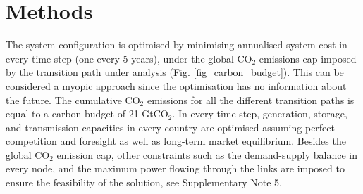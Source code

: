 \documentclass[5p]{elsarticle} %
\begin{document}



\section{Methods}

The system configuration is optimised by minimising annualised system cost in every time step (one every 5 years), under the global CO$_2$ emissions cap imposed by the transition path under analysis (Fig. \ref{fig_carbon_budget}). This can be considered a myopic approach since the optimisation has no information about the future. The cumulative CO$_2$ emissions for all the different transition paths is equal to a carbon budget of 21 GtCO$_2$. In every time step, generation, storage, and transmission capacities in every country are optimised assuming perfect competition and foresight as well as long-term market equilibrium. Besides the global CO$_2$ emission cap, other constraints such as the demand-supply balance in every node, and the maximum power flowing through the links are imposed to ensure the feasibility of the solution, see Supplementary Note 5. \
\end{document}
